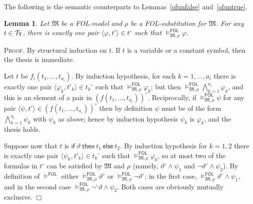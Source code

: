 \documentclass{article}
\newtheorem{lemma}[definition]{Lemma}
\newenvironment{proof}{\smallskip\textsc{Proof.}}{\hspace*{\fill}$\Box$}
\newcommand{\FOL}{\textsf{FOL}}
\newcommand{\ifthelse}[3]{\ensuremath{\mathsf{if}\ {#1}\ \mathsf{then}\ {#2}\ \mathsf{else}\ {#3}}}
\newcommand{\ofun}[1]{\ensuremath{{#1}^\circ}}
\newcommand{\pair}[2]{\ensuremath{\langle{#1},{#2}\rangle}}
\newcommand{\terms}[1]{\ensuremath{{\cal T}_{\mathsf{#1}}}}
\newcommand{\mymodels}[1]{\ensuremath{\models^{\mathsf{#1}}}}
\newcommand{\mymodelss}[3]{\ensuremath{\models_{\mathfrak{#2},{#3}}^{\mathsf{#1}}}}
\begin{document}
\bigskip\noindent
The following is the semantic counterparts to Lemmas~\ref{ofunfalse}
and~\ref{ofuntrue}.
\begin{lemma}\label{ofunFOLinterpretation} Let $\mathfrak M$ be a
{\FOL}-model and $\rho$ be a {\FOL}-substitution for $\mathfrak M$.
For any $t\in\terms{T}$, there is exactly one pair
$\pair\varphi{t'}\in\ofun{t}$ such that $\mymodelss{FOL}M\rho\varphi$.
\end{lemma}
\begin{proof}
By structural induction on $t$.
If $t$ is a variable or a constant symbol, then the thesis is immediate.

Let $t$ be $f_i(t_1,\ldots,t_{a_i})$.  By induction hypothesis, for
each $k=1,\ldots,a_i$ there is exactly one pair
$\pair{\varphi_k}{t'_k}\in\ofun{t_k}$ such that
$\mymodelss{FOL}M\rho\varphi_k$; but then
$\mymodelss{FOL}M\rho\bigwedge_{k=1}^{a_i}\varphi_k$, and this is an
element of a pair in $\ofun{(f(t_1,\ldots,t_{a_i}))}$.  Reciprocally,
if $\mymodelss{FOL}M\rho\psi$ for any pair
$\pair\psi{t'}\in\ofun{(f(t_1,\ldots,t_{a_i}))}$ then by definition
$\psi$ must be of the form $\bigwedge_{k=1}^{a_i}\psi_k$ with $\psi_k$
as above; hence by induction hypothesis $\psi_k$ is $\varphi_k$, and
the thesis holds.

Suppose now that $t$ is {\ifthelse\vartheta{t_1}{t_2}}.  
By induction hypothesis for $k=1,2$ there is exactly one pair
$\pair{\psi_k}{t'_k}\in\ofun{t_k}$ such that
$\mymodelss{FOL}M\rho\varphi_k$, so at most two of the formulas
in {\ofun{t}} can be satisfied by $\mathfrak M$ and $\rho$
(namely, $\ofun\vartheta\wedge\psi_1$ and $\neg\ofun\vartheta\wedge\psi_2$).
By definition of $\mymodels{FOL}$ either $\mymodelss{FOL}M\rho\ofun\vartheta$
or $\mymodelss{FOL}M\rho\neg\ofun\vartheta$; in the first case,
$\mymodelss{FOL}M\rho\ofun\vartheta\wedge\psi_1$, and in the second case
$\mymodelss{FOL}M\rho\ofun\neg\vartheta\wedge\psi_2$.  Both cases are obviously
mutually exclusive.
\end{proof}
\end{document}
